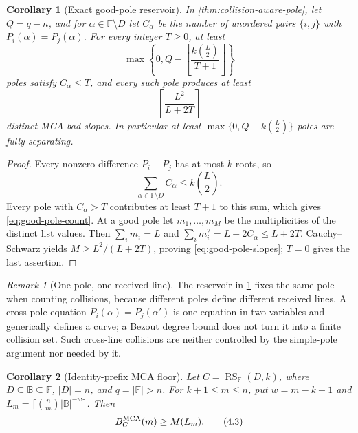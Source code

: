 \documentclass[11pt,a4paper]{amsart}
\numberwithin{equation}{section}
\newtheorem{corollary}[corollary]{Corollary}
\theoremstyle{remark}
\newtheorem{remark}[remark]{Remark}
\DeclareMathOperator{\RS}{RS}
\newcommand{\F}{\mathbb F}
\newcommand{\B}{\mathbb B}
\newcommand{\abs}[1]{\lvert #1\rvert}
\newcommand{\floor}[1]{\left\lfloor #1\right\rfloor}
\newcommand{\ceil}[1]{\left\lceil #1\right\rceil}
\begin{document}
\begin{corollary}[Exact good-pole reservoir]
\label{cor:exact-good-pole-reservoir}
In \cref{thm:collision-aware-pole}, let \(Q=q-n\), and for
\(\alpha\in\F\setminus D\) let \(C_\alpha\) be the number of unordered
pairs \(\{i,j\}\) with \(P_i(\alpha)=P_j(\alpha)\).  For every integer
\(T\ge0\), at least
\[
 \max\left\{0,Q-
   \floor{\frac{k\binom L2}{T+1}}\right\}          \tag{PR1}
\label{eq:good-pole-count}
\]
poles satisfy \(C_\alpha\le T\), and every such pole produces at least
\[
                     \ceil{\frac{L^2}{L+2T}}       \tag{PR2}
\label{eq:good-pole-slopes}
\]
distinct MCA-bad slopes.  In particular at least
\(\max\{0,Q-k\binom L2\}\) poles are fully separating.
\end{corollary}

\begin{proof}
Every nonzero difference \(P_i-P_j\) has at most \(k\) roots, so
\[
                 \sum_{\alpha\in\F\setminus D}C_\alpha
                    \le k\binom L2.
\]
Every pole with \(C_\alpha>T\) contributes at least \(T+1\) to this
sum, which gives \eqref{eq:good-pole-count}.  At a good
pole let \(m_1,\ldots,m_M\) be the multiplicities of the distinct list
values.  Then
\(\sum_im_i=L\) and
\(\sum_im_i^2=L+2C_\alpha\le L+2T\).  Cauchy--Schwarz yields
\(M\ge L^2/(L+2T)\), proving \eqref{eq:good-pole-slopes}; \(T=0\)
gives the last assertion.
\end{proof}

\begin{remark}[One pole, one received line]
The reservoir in \cref{cor:exact-good-pole-reservoir} fixes the same pole
when counting collisions, because different poles define different
received lines.  A cross-pole equation
\(P_i(\alpha)=P_j(\alpha')\) is one equation in two variables and
generically defines a curve; a Bezout degree bound does not turn it into a
finite collision set.  Such cross-line collisions are neither controlled
by the simple-pole argument nor needed by it.
\end{remark}

\begin{corollary}[Identity-prefix MCA floor]\label{cor:identity-prefix-floor}
Let \(C=\RS_\F(D,k)\), where
\(D\subseteq\B\subseteq\F\), \(\abs D=n\), and
\(q=\abs\F>n\).  For \(k+1\le m\le n\), put \(w=m-k-1\) and
\(L_m=\lceil\binom nm\abs\B^{-w}\rceil\).  Then
\[
 B_C^{\rm MCA}(m)\ge M(L_m).
 \tag{4.3}\label{eq:identity-prefix-floor}
\]
\end{corollary}
\end{document}
